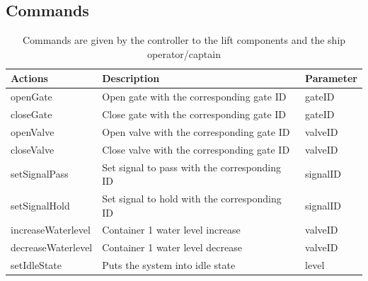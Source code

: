 \subsection{Commands}
\begin{table}[htbp]
	\centering
	\caption{Commands are given by the controller to the lift components and the ship operator/captain}
	\begin{tabular}{lll}
		\toprule
		\textbf{Actions} & \textbf{Description} & \textbf{Parameter} \\
		\midrule
		openGate & Open gate with the corresponding gate ID & gateID \\
		closeGate & Close gate with the corresponding gate ID & gateID \\
		openValve & Open valve with the corresponding gate ID & valveID \\
		closeValve & Close valve with the corresponding gate ID & valveID \\
		setSignalPass & Set signal to pass with the corresponding ID  & signalID \\
		setSignalHold & Set signal to hold with the corresponding ID  & signalID \\
		increaseWaterlevel & Container 1 water level increase & valveID \\
		decreaseWaterlevel & Container 1 water level decrease & valveID \\
		setIdleState & Puts the system into idle state & level \\ %
		\bottomrule
		\end{tabular}%
		\label{tab:addlabel}%
		\end{table}%
		
		\pagebreak
		
